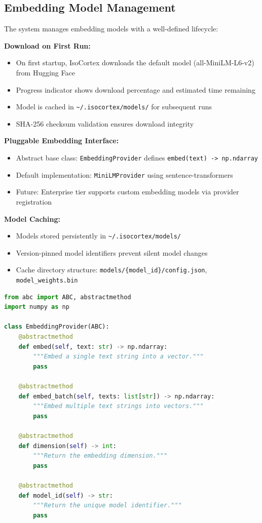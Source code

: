 \documentclass[11pt,a4paper]{article}
\newcommand{\inlinecode}[1]{\texttt{\small\colorbox{ctCodeBg}{#1}}}
\begin{document}
\subsection{Embedding Model Management}

\begin{reqbox}
The system manages embedding models with a well-defined lifecycle:

\textbf{Download on First Run:}
\begin{itemize}
    \item On first startup, IsoCortex downloads the default model (all-MiniLM-L6-v2) from Hugging Face
    \item Progress indicator shows download percentage and estimated time remaining
    \item Model is cached in \inlinecode{\textasciitilde/.isocortex/models/} for subsequent runs
    \item SHA-256 checksum validation ensures download integrity
\end{itemize}

\textbf{Pluggable Embedding Interface:}
\begin{itemize}
    \item Abstract base class: \inlinecode{EmbeddingProvider} defines \inlinecode{embed(text) -> np.ndarray}
    \item Default implementation: \inlinecode{MiniLMProvider} using sentence-transformers
    \item Future: Enterprise tier supports custom embedding models via provider registration
\end{itemize}

\textbf{Model Caching:}
\begin{itemize}
    \item Models stored persistently in \inlinecode{\textasciitilde/.isocortex/models/}
    \item Version-pinned model identifiers prevent silent model changes
    \item Cache directory structure: \inlinecode{models/\{model\_id\}/config.json}, \inlinecode{model\_weights.bin}
\end{itemize}
\end{reqbox}

\begin{lstlisting}[language=Python,title={EmbeddingProvider ABC}]
from abc import ABC, abstractmethod
import numpy as np

class EmbeddingProvider(ABC):
    @abstractmethod
    def embed(self, text: str) -> np.ndarray:
        """Embed a single text string into a vector."""
        pass

    @abstractmethod
    def embed_batch(self, texts: list[str]) -> np.ndarray:
        """Embed multiple text strings into vectors."""
        pass

    @abstractmethod
    def dimension(self) -> int:
        """Return the embedding dimension."""
        pass

    @abstractmethod
    def model_id(self) -> str:
        """Return the unique model identifier."""
        pass
\end{lstlisting}
\end{document}

